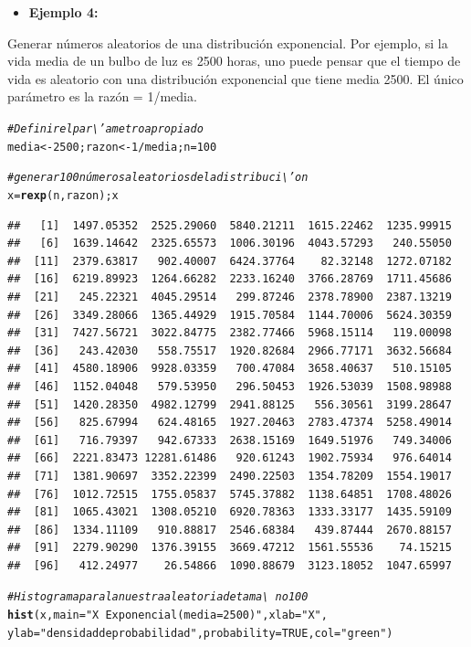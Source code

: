 \documentclass[12pt,letterpaper]{article}\usepackage[]{graphicx}\usepackage[]{color}
\makeatletter
\newcommand{\hlnum}[1]{\textcolor[rgb]{0.686,0.059,0.569}{#1}}%
\newcommand{\hlstr}[1]{\textcolor[rgb]{0.192,0.494,0.8}{#1}}%
\newcommand{\hlcom}[1]{\textcolor[rgb]{0.678,0.584,0.686}{\textit{#1}}}%
\newcommand{\hlopt}[1]{\textcolor[rgb]{0,0,0}{#1}}%
\newcommand{\hlstd}[1]{\textcolor[rgb]{0.345,0.345,0.345}{#1}}%
\newcommand{\hlkwb}[1]{\textcolor[rgb]{0.69,0.353,0.396}{#1}}%
\newcommand{\hlkwc}[1]{\textcolor[rgb]{0.333,0.667,0.333}{#1}}%
\newcommand{\hlkwd}[1]{\textcolor[rgb]{0.737,0.353,0.396}{\textbf{#1}}}%
\newenvironment{kframe}{%
 \def\at@end@of@kframe{}%
 \ifinner\ifhmode%
  \def\at@end@of@kframe{\end{minipage}}%
  \begin{minipage}{\columnwidth}%
 \fi\fi%
 \def\FrameCommand##1{\hskip\@totalleftmargin \hskip-\fboxsep
 \colorbox{shadecolor}{##1}\hskip-\fboxsep
     \hskip-\linewidth \hskip-\@totalleftmargin \hskip\columnwidth}%
 \MakeFramed {\advance\hsize-\width
   \@totalleftmargin\z@ \linewidth\hsize
   \@setminipage}}%
 {\par\unskip\endMakeFramed%
 \at@end@of@kframe}
\newenvironment{knitrout}{}{} %
\makeatother
\begin{document}
\begin{itemize}
  \item \textbf{Ejemplo 4:}
\end{itemize}
Generar n\'umeros aleatorios de una distribuci\'on exponencial. Por ejemplo, si la vida media de un bulbo de luz es 2500 horas, uno puede pensar que el tiempo de vida es aleatorio con una distribuci\'on exponencial que tiene media 2500. El \'unico par\'ametro es la raz\'on = 1/media.
\begin{knitrout}
\color{fgcolor}\begin{kframe}
\begin{alltt}
\hlcom{# Definir el par\textbackslash{}'ametro apropiado }
\hlstd{media} \hlkwb{<-} \hlnum{2500}\hlstd{; razon} \hlkwb{<-} \hlnum{1}\hlopt{/}\hlstd{media;n}\hlkwb{=}\hlnum{100}

\hlcom{# generar 100 números aleatorios de la distribuci\textbackslash{}'on }
\hlstd{x} \hlkwb{=} \hlkwd{rexp}\hlstd{(n, razon); x}
\end{alltt}
\begin{verbatim}
##   [1]  1497.05352  2525.29060  5840.21211  1615.22462  1235.99915
##   [6]  1639.14642  2325.65573  1006.30196  4043.57293   240.55050
##  [11]  2379.63817   902.40007  6424.37764    82.32148  1272.07182
##  [16]  6219.89923  1264.66282  2233.16240  3766.28769  1711.45686
##  [21]   245.22321  4045.29514   299.87246  2378.78900  2387.13219
##  [26]  3349.28066  1365.44929  1915.70584  1144.70006  5624.30359
##  [31]  7427.56721  3022.84775  2382.77466  5968.15114   119.00098
##  [36]   243.42030   558.75517  1920.82684  2966.77171  3632.56684
##  [41]  4580.18906  9928.03359   700.47084  3658.40637   510.15105
##  [46]  1152.04048   579.53950   296.50453  1926.53039  1508.98988
##  [51]  1420.28350  4982.12799  2941.88125   556.30561  3199.28647
##  [56]   825.67994   624.48165  1927.20463  2783.47374  5258.49014
##  [61]   716.79397   942.67333  2638.15169  1649.51976   749.34006
##  [66]  2221.83473 12281.61486   920.61243  1902.75934   976.64014
##  [71]  1381.90697  3352.22399  2490.22503  1354.78209  1554.19017
##  [76]  1012.72515  1755.05837  5745.37882  1138.64851  1708.48026
##  [81]  1065.43021  1308.05210  6920.78363  1333.33177  1435.59109
##  [86]  1334.11109   910.88817  2546.68384   439.87444  2670.88157
##  [91]  2279.90290  1376.39155  3669.47212  1561.55536    74.15215
##  [96]   412.24977    26.54866  1090.88679  3123.18052  1047.65997
\end{verbatim}
\begin{alltt}
\hlcom{# Histograma para la nuestra aleatoria de tama\textbackslash{}~no 100 }
\hlkwd{hist}\hlstd{(x,} \hlkwc{main}\hlstd{=}\hlstr{"X ~ Exponencial( media = 2500 )"}\hlstd{,} \hlkwc{xlab}\hlstd{=}\hlstr{"X"}\hlstd{,}
     \hlkwc{ylab}\hlstd{=}\hlstr{"densidad de probabilidad"}\hlstd{,} \hlkwc{probability}\hlstd{=}\hlnum{TRUE}\hlstd{,} \hlkwc{col}\hlstd{=}\hlstr{"green"}\hlstd{)}


\end{alltt}
\end{kframe}
\end{knitrout}
\end{document}

